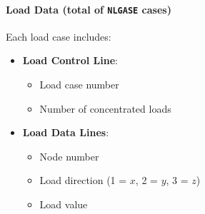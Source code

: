 \documentclass[a4paper,12pt]{report}
\begin{document}
\paragraph{Load Data (total of \texttt{NLGASE} cases)}  
Each load case includes:
\begin{itemize}
  \item \textbf{Load Control Line}:
    \begin{itemize}
      \item Load case number
      \item Number of concentrated loads
    \end{itemize}
  \item \textbf{Load Data Lines}:
    \begin{itemize}
      \item Node number
      \item Load direction (1 = $x$, 2 = $y$, 3 = $z$)
      \item Load value
    \end{itemize}
\end{itemize}
\end{document}

